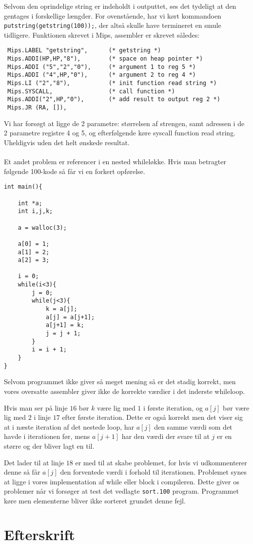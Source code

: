 \documentclass[12pt]{article}
\begin{document}
Selvom den oprindelige string er indeholdt i outputtet, ses det tydeligt at den
gentages i forskellige længder. For ovenstående, har vi kørt kommandoen
\texttt{putstring(getstring(100));}, der altså skulle have termineret en smule
tidligere. Funktionen skrevet i Mips, assembler er skrevet således:

\begin{verbatim}
 Mips.LABEL "getstring",      (* getstring *)
 Mips.ADDI(HP,HP,"8"),        (* space on heap pointer *)
 Mips.ADDI ("5","2","0"),     (* argument 1 to reg 5 *)  
 Mips.ADDI ("4",HP,"0"),      (* argument 2 to reg 4 *)    
 Mips.LI ("2","8"),           (* init function read string *)
 Mips.SYSCALL,                (* call function *)
 Mips.ADDI("2",HP,"0"),       (* add result to output reg 2 *)    
 Mips.JR (RA, []),
\end{verbatim}

Vi har forsøgt at ligge de 2 parametre: størrelsen af strengen, samt adressen i
de 2 parametre registre 4 og 5, og efterfølgende køre syscall function
read string. Uheldigvis uden det helt ønskede resultat.
\\
\\
Et andet problem er referencer i en nested whileløkke. Hvis man betragter
følgende 100-kode så får vi en forkert opførelse.

\begin{verbatim}
int main(){

    int *a;
    int i,j,k;

    a = walloc(3);

    a[0] = 1;
    a[1] = 2;
    a[2] = 3;

    i = 0;
    while(i<3){
        j = 0;
        while(j<3){
            k = a[j];
            a[j] = a[j+1];
            a[j+1] = k;
            j = j + 1;
        }
        i = i + 1;
    }
}
\end{verbatim}

Selvom programmet ikke giver så meget mening så er det stadig korrekt, men vores
oversatte assembler giver ikke de korrekte værdier i det inderste whileloop.

Hvis man ser på linje $16$ bør $k$ være lig med $1$ i første iteration, og
$a[j]$ bør være lig med $2$ i linje $17$ efter første iteration. Dette er også
korrekt men det viser sig at i næste iteration af det nestede loop, har $a[j]$
den samme værdi som det havde i iterationen før, mens $a[j+1]$ har den værdi der
svare til at $j$ er en større og der bliver lagt en til.

Det lader til at linje $18$ er med til at skabe problemet, for hvis vi
udkommenterer denne så får $a[j]$ den forventede værdi i forhold til
iterationen. Problemet synes at ligge i vores implementation af while eller
block i compileren. Dette giver os problemer når vi forsøger at test det
vedlagte \texttt{sort.100} program. Programmet køre men elementerne bliver ikke
sorteret grundet denne fejl.

\section{Efterskrift}

{}

\end{document}
